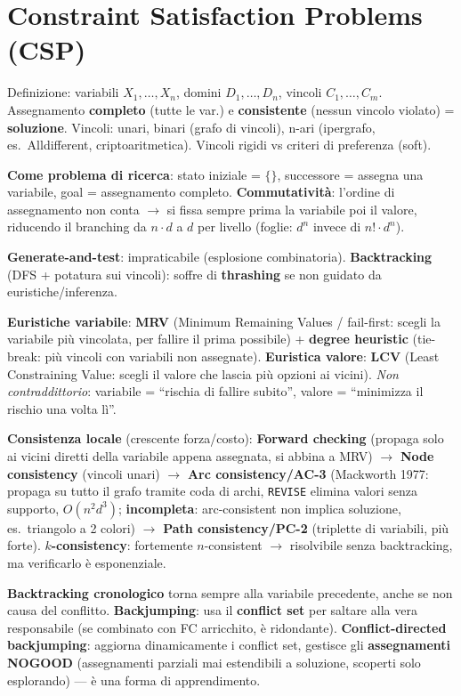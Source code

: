 \documentclass[10pt,a4paper]{article}
\begin{document}
\section{Constraint Satisfaction Problems (CSP)}

Definizione: variabili $X_1,\dots,X_n$, domini $D_1,\dots,D_n$, vincoli $C_1,\dots,C_m$. Assegnamento \textbf{completo} (tutte le var.) e \textbf{consistente} (nessun vincolo violato) = \textbf{soluzione}. Vincoli: unari, binari (grafo di vincoli), n-ari (ipergrafo, es.\ Alldifferent, criptoaritmetica). Vincoli rigidi vs criteri di preferenza (soft).

\textbf{Come problema di ricerca}: stato iniziale = $\{\}$, successore = assegna una variabile, goal = assegnamento completo. \textbf{Commutatività}: l'ordine di assegnamento non conta $\to$ si fissa sempre prima la variabile poi il valore, riducendo il branching da $n\cdot d$ a $d$ per livello (foglie: $d^n$ invece di $n!\cdot d^n$).

\textbf{Generate-and-test}: impraticabile (esplosione combinatoria). \textbf{Backtracking} (DFS + potatura sui vincoli): soffre di \textbf{thrashing} se non guidato da euristiche/inferenza.

\textbf{Euristiche variabile}: \textbf{MRV} (Minimum Remaining Values / fail-first: scegli la variabile più vincolata, per fallire il prima possibile) + \textbf{degree heuristic} (tie-break: più vincoli con variabili non assegnate).
\textbf{Euristica valore}: \textbf{LCV} (Least Constraining Value: scegli il valore che lascia più opzioni ai vicini). \emph{Non contraddittorio}: variabile = ``rischia di fallire subito'', valore = ``minimizza il rischio una volta lì''.

\textbf{Consistenza locale} (crescente forza/costo): \textbf{Forward checking} (propaga solo ai vicini diretti della variabile appena assegnata, si abbina a MRV) $\to$ \textbf{Node consistency} (vincoli unari) $\to$ \textbf{Arc consistency/AC-3} (Mackworth 1977: propaga su tutto il grafo tramite coda di archi, \texttt{REVISE} elimina valori senza supporto, $O(n^2d^3)$; \textbf{incompleta}: arc-consistent non implica soluzione, es.\ triangolo a 2 colori) $\to$ \textbf{Path consistency/PC-2} (triplette di variabili, più forte). \textbf{$k$-consistency}: fortemente $n$-consistent $\to$ risolvibile senza backtracking, ma verificarlo è esponenziale.

\textbf{Backtracking cronologico} torna sempre alla variabile precedente, anche se non causa del conflitto. \textbf{Backjumping}: usa il \textbf{conflict set} per saltare alla vera responsabile (se combinato con FC arricchito, è ridondante). \textbf{Conflict-directed backjumping}: aggiorna dinamicamente i conflict set, gestisce gli \textbf{assegnamenti NOGOOD} (assegnamenti parziali mai estendibili a soluzione, scoperti solo esplorando) --- è una forma di apprendimento.
\end{document}

